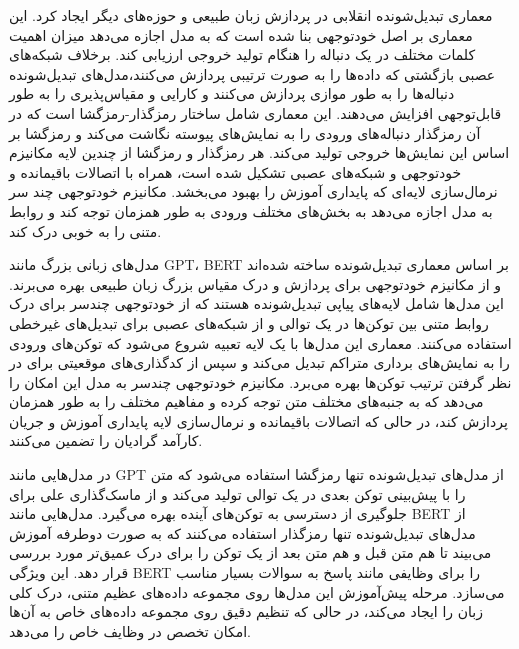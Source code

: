 


معماری تبدیل‌شونده انقلابی در پردازش زبان طبیعی و حوزه‌های دیگر ایجاد کرد. این معماری بر اصل خودتوجهی بنا شده است که به مدل اجازه می‌دهد میزان اهمیت کلمات مختلف در یک دنباله را هنگام تولید خروجی ارزیابی کند. برخلاف شبکه‌های عصبی بازگشتی که داده‌ها را به صورت ترتیبی پردازش می‌کنند،مدل‌های تبدیل‌شونده دنباله‌ها را به طور موازی پردازش می‌کنند و کارایی و مقیاس‌پذیری را به طور قابل‌توجهی افزایش می‌دهند. این معماری شامل ساختار رمز‌گذار-رمزگشا است که در آن رمزگذار دنباله‌های ورودی را به نمایش‌های پیوسته نگاشت می‌کند و رمزگشا بر اساس این نمایش‌ها خروجی تولید می‌کند. هر رمزگذار و رمزگشا از چندین لایه مکانیزم خودتوجهی و شبکه‌های عصبی تشکیل شده است، همراه با اتصالات باقیمانده و نرمال‌سازی لایه‌ای که پایداری آموزش را بهبود می‌بخشد. مکانیزم خودتوجهی چند سر به مدل اجازه می‌دهد به بخش‌های مختلف ورودی به طور همزمان توجه کند و روابط متنی را به خوبی درک کند.



مدل‌های زبانی بزرگ مانند GPT، BERT  بر اساس معماری تبدیل‌شونده ساخته شده‌اند و از مکانیزم خودتوجهی برای پردازش و درک مقیاس بزرگ زبان طبیعی بهره می‌برند. این مدل‌ها شامل لایه‌های پیاپی تبدیل‌شونده هستند که از خودتوجهی چندسر برای درک روابط متنی بین توکن‌ها در یک توالی و از شبکه‌های عصبی برای تبدیل‌های غیرخطی استفاده می‌کنند. معماری این مدل‌ها با یک لایه تعبیه شروع می‌شود که توکن‌های ورودی را به نمایش‌های برداری متراکم تبدیل می‌کند و سپس از کدگذاری‌های موقعیتی برای در نظر گرفتن ترتیب توکن‌ها بهره می‌برد. مکانیزم خودتوجهی چندسر به مدل این امکان را می‌دهد که به جنبه‌های مختلف متن توجه کرده و مفاهیم مختلف را به طور همزمان پردازش کند، در حالی که اتصالات باقیمانده و نرمال‌سازی لایه پایداری آموزش و جریان کارآمد گرادیان را تضمین می‌کنند.

در مدل‌هایی مانند GPT از مدل‌های تبدیل‌شونده تنها رمزگشا استفاده می‌شود که متن را با پیش‌بینی توکن بعدی در یک توالی تولید می‌کند و از ماسک‌گذاری علی برای جلوگیری از دسترسی به توکن‌های آینده بهره می‌گیرد. مدل‌هایی مانند BERT از مدل‌های تبدیل‌شونده تنها رمزگذار استفاده می‌کنند که به صورت دوطرفه آموزش می‌بیند تا هم متن قبل و هم متن بعد از یک توکن را برای درک عمیق‌تر مورد بررسی قرار دهد. این ویژگی BERT را برای وظایفی مانند پاسخ به سوالات بسیار مناسب می‌سازد. مرحله پیش‌آموزش این مدل‌ها روی مجموعه داده‌های عظیم متنی، درک کلی زبان را ایجاد می‌کند، در حالی که تنظیم دقیق روی مجموعه داده‌های خاص به آن‌ها امکان تخصص در وظایف خاص را می‌دهد.

